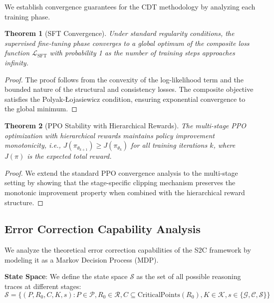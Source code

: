 \documentclass[10pt,twocolumn]{article}
\newtheorem{theorem}{Theorem}
\newcommand{\ssc}{\textsc{S2C}}
\newcommand{\cdt}{\textsc{CDT}}
\newcommand{\Generator}{\mathcal{G}}
\newcommand{\Critic}{\mathcal{C}}
\newcommand{\Synthesizer}{\mathcal{S}}
\begin{document}
We establish convergence guarantees for the \cdt{} methodology by analyzing each training phase.

\begin{theorem}[SFT Convergence]
\label{thm:sft_convergence}
Under standard regularity conditions, the supervised fine-tuning phase converges to a global optimum of the composite loss function $\mathcal{L}_{\text{SFT}}$ with probability 1 as the number of training steps approaches infinity.
\end{theorem}

\begin{proof}
The proof follows from the convexity of the log-likelihood term and the bounded nature of the structural and consistency losses. The composite objective satisfies the Polyak-Łojasiewicz condition, ensuring exponential convergence to the global minimum.
\end{proof}

\begin{theorem}[PPO Stability with Hierarchical Rewards]
\label{thm:ppo_stability}
The multi-stage PPO optimization with hierarchical rewards maintains policy improvement monotonicity, i.e., $J(\pi_{\theta_{k+1}}) \geq J(\pi_{\theta_k})$ for all training iterations $k$, where $J(\pi)$ is the expected total reward.
\end{theorem}

\begin{proof}
We extend the standard PPO convergence analysis to the multi-stage setting by showing that the stage-specific clipping mechanism preserves the monotonic improvement property when combined with the hierarchical reward structure.
\end{proof}

\subsection{Error Correction Capability Analysis}

We analyze the theoretical error correction capabilities of the \ssc{} framework by modeling it as a Markov Decision Process (MDP).

\textbf{State Space}: We define the state space $\mathcal{S}$ as the set of all possible reasoning traces at different stages:
\begin{equation}
\mathcal{S} = \{(P, R_0, C, K, s) : P \in \mathcal{P}, R_0 \in \mathcal{R}, C \subseteq \text{CriticalPoints}(R_0), K \in \mathcal{K}, s \in \{\Generator, \Critic, \Synthesizer\}\}
\end{equation}
\end{document}
